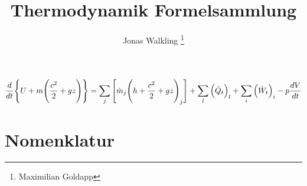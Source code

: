 \documentclass[twocolumn]{article}
\title{Thermodynamik Formelsammlung}
\author{Jonas Walkling \thanks{Maximilian Goldapp}}
\begin{document}
\onecolumn
\maketitle
\pagebreak
\tableofcontents
\twocolumn
\pagebreak

\Large
\begin{equation*}
	\frac{d}{dt}\Bigg{\{} U + m \Bigg{(}\frac{c^2}{2}+gz\Bigg{)}\Bigg{\}} 
	= 
	\sum_{j}{\Bigg{[}\dot{m}_j\Bigg{(}h+\frac{c^2}{2}+gz\Bigg{)}_j \Bigg{]}}  
	+ 
	\sum_{l}^{} \Big(\dot{Q}_t\Big)_l 
	+ 
	\sum_{i}\Big(\dot{W}_t\Big)_i
	-
	p\frac{dV}{dt}
\end{equation*}

\normalsize


\section{Nomenklatur}
\end{document}
